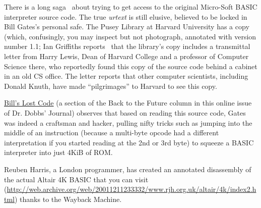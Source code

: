 There is a long saga~\cite{raiders} about trying to get access to the original
Micro-Soft BASIC interpreter source code.
The true \emph{urtext\/} is still elusive, believed to be locked in Bill Gates's
personal safe.
The Pusey Library at Harvard University has a copy (which, confusingly, you may
inspect but not photograph, annotated with version number 1.1;
Ian Griffiths reports~\cite{ians_trip} that the library's copy includes
a transmittal letter from 
Harry Lewis, Dean of Harvard College and a professor of Computer
Science there, who reportedly found this copy of the source code behind
a cabinet in an old CS office.
The letter reports that other computer scientists, including Donald
Knuth, have made ``pilgrimages'' to Harvard to see this copy.

\href{http://www.drdobbs.com/back-to-the-future/184404733}{Bill's
  Lost Code} (a section of the Back to the Future column in this online
issue of Dr. Dobbs' Journal) observes that based on reading this source
code, Gates was indeed a craftsman and hacker, pulling nifty tricks such
as jumping into the middle of an instruction (because a multi-byte
opcode had a different interpretation if you started reading at the 2nd
or 3rd byte) to squeeze a BASIC interpreter into just 4KiB of ROM.


Reuben Harris, a London programmer, has created an
annotated
disassembly of the actual Altair 4K BASIC 
that you can visit (\url{http://web.archive.org/web/20011211233332/www.rjh.org.uk/altair/4k/index2.html}) thanks to the
Wayback Machine.
